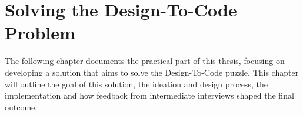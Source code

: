\newpage
\section{Solving the Design-To-Code Problem}
The following chapter documents the practical part of this thesis, focusing on developing a
solution that aims to solve the Design-To-Code puzzle. This chapter will outline the goal of this
solution, the ideation and design process, the implementation and how feedback from intermediate
interviews shaped the final outcome.







